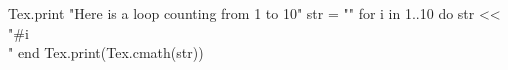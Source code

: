 \documentclass{article}
\begin{document}
\begin{rbtex}
Tex.print "Here is a loop counting from 1 to 10"
str = ""
for i in 1..10 do
    str << "#{i}\\ "
end
Tex.print(Tex.cmath(str))
\end{rbtex}
\end{document}
